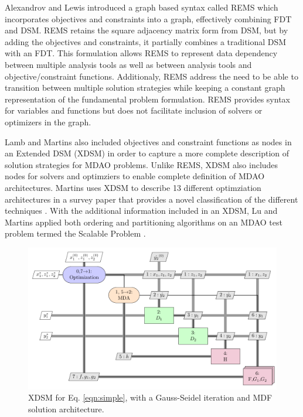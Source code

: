     Alexandrov and Lewis introduced a graph based syntax called REMS which 
    incorporates objectives and constraints into a graph, effectively combining 
    FDT and DSM\cite{alexandrov2004}. REMS retains the square adjacency 
    matrix form from DSM, but by adding the objectives and constraints, it partially 
    combines a traditional DSM with an FDT. This formulation allows REMS to represent data 
    dependency between multiple analysis tools as well as between analysis tools and
    objective/constraint functions. Additionaly, REMS address the need to be able to 
    transition between multiple solution strategies while keeping a constant 
    graph representation of the fundamental problem formulation. REMS provides
    syntax for variables and functions but does not facilitate inclusion 
    of solvers or optimizers in the graph. 

    Lamb and Martins also included objectives and constraint functions as nodes 
    in an Extended DSM (XDSM) in order to capture a more complete description 
    of solution strategies for MDAO problems\cite{Lambe2012}. Unlike REMS, 
    XDSM also includes nodes for solvers and optimziers to enable complete 
    definition of MDAO architectures. Martins uses XDSM to describe 13 different 
    optimziation architectures in a survey paper that provides a novel 
    classification of the different techniques \cite{Lambe2011}. With the 
    additional information included in an XDSM, Lu and Martins applied both 
    ordering and partitioning algorithms on an MDAO test problem termed the 
    Scalable Problem \cite{Lu2012}. 

    \begin{figure}
        \begin{center}
        \includegraphics[height=.25\textheight]{XDSM/simple}
        \caption{XDSM for Eq. \ref{eqn:simple}, with a Gauss-Seidel iteration and MDF solution architecture. \label{fig:XDSM_simple}}
        \end{center}
    \end{figure}

